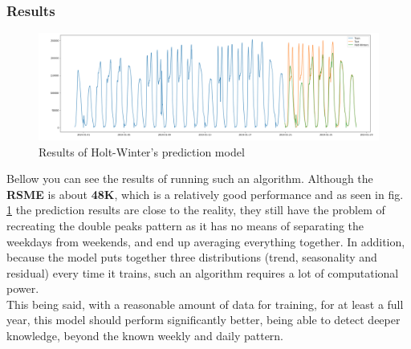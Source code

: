 \subsubsection{Results}
\begin{figure}
    \includegraphics[width=1\textwidth]{images/holt-winter-result.png}
    \caption{Results of Holt-Winter's prediction model}
    \label{fig:holt_winter_results}
\end{figure}
Bellow you can see the results of running such an algorithm. Although the \textbf{RSME} is about \textbf{48K}, which is a relatively good performance and as seen in  fig. \ref{fig:holt_winter_results} the prediction results are close to the reality, they still have the problem of recreating the double peaks pattern as it has no means of separating the weekdays from weekends, and end up averaging everything together. In addition, because the model puts together three distributions (trend, seasonality and residual) every time it trains, such an algorithm requires a lot of computational power.\\
This being said, with a reasonable amount of data for training, for at least a full year, this model should perform significantly better, being able to detect deeper knowledge, beyond the known weekly and daily pattern.